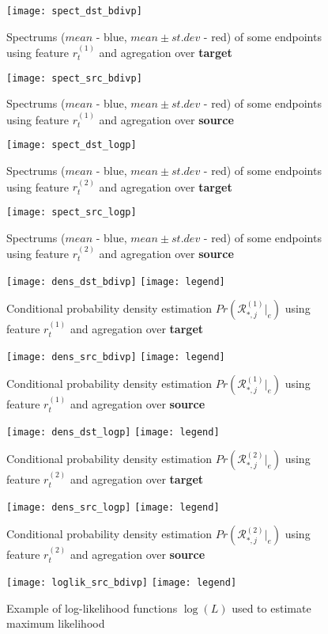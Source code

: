 \documentclass[a4paper,journal]{IEEEtran}
\begin{document}
\begin{figure}[h!]%
  \centering
  \texttt{[image: spect\_dst\_bdivp]}
  \caption{Spectrums ($mean$ - blue, $mean\pm st.dev$ - red) of some  endpoints using feature $r_t^{(1)}$ and agregation over \textbf{target}}
  \label{fig:spect_dst_bdivp}
\end{figure}
\begin{figure}[h!]%
  \centering
  \texttt{[image: spect\_src\_bdivp]}
  \caption{Spectrums ($mean$ - blue, $mean\pm st.dev$ - red) of some  endpoints using feature $r_t^{(1)}$ and agregation over \textbf{source}}
  \label{fig:spect_src_bdivp}
\end{figure}
\begin{figure}[h!]%
  \centering
  \texttt{[image: spect\_dst\_logp]}
  \caption{Spectrums ($mean$ - blue, $mean\pm st.dev$ - red) of some  endpoints using feature $r_t^{(2)}$ and agregation over \textbf{target}}
  \label{fig:spect_dst_logp}
\end{figure}
\begin{figure}[h!]%
  \centering
  \texttt{[image: spect\_src\_logp]}
  \caption{Spectrums ($mean$ - blue, $mean\pm st.dev$ - red) of some  endpoints using feature $r_t^{(2)}$ and agregation over \textbf{source}}
  \label{fig:spect_src_logp}
\end{figure}
\begin{figure}[h!]%
  \centering
  \texttt{[image: dens\_dst\_bdivp]}
      \texttt{[image: legend]}
  \caption{Conditional probability density estimation $Pr ( \mathcal{R}^{(1)}_{*,j}|_e ) $ using feature $r_t^{(1)}$ and agregation over \textbf{target}}
  \label{fig:dens_dst_bdivp}
\end{figure}
\begin{figure}[h!]%
  \centering
  \texttt{[image: dens\_src\_bdivp]}
    \texttt{[image: legend]}
  \caption{Conditional probability density estimation $Pr ( \mathcal{R}^{(1)}_{*,j}|_e ) $ using feature $r_t^{(1)}$ and agregation over \textbf{source}}
  \label{fig:dens_src_bdivp}
\end{figure}
\begin{figure}[h!]%
  \centering
  \texttt{[image: dens\_dst\_logp]}
      \texttt{[image: legend]}
  \caption{Conditional probability density estimation $Pr ( \mathcal{R}^{(2)}_{*,j}|_e ) $ using feature $r_t^{(2)}$ and agregation over \textbf{target}}
  \label{fig:dens_dst_logp}
\end{figure}
\begin{figure}[h!]%
  \centering
  \texttt{[image: dens\_src\_logp]}
  \texttt{[image: legend]}
  \caption{Conditional probability density estimation $Pr ( \mathcal{R}^{(2)}_{*,j}|_e ) $ using feature $r_t^{(2)}$ and agregation over \textbf{source}}
  \label{fig:dens_src_logp}
\end{figure}
\begin{figure}[h!]%
  \centering
  \texttt{[image: loglik\_src\_bdivp]}
  \texttt{[image: legend]}
  \caption{Example of log-likelihood functions $\log(L)$ used to estimate maximum likelihood}
  \label{fig:loglik_src_bdivp}
\end{figure}
\end{document}
